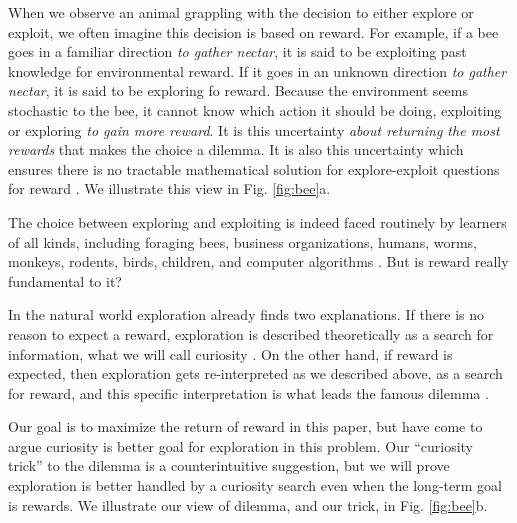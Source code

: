 When we observe an animal grappling with the decision to either explore or exploit, we often imagine this decision is based on reward. For example, if a bee goes in a familiar direction \textit{to gather nectar}, it is said to be exploiting past knowledge for environmental reward. If it goes in an unknown direction \textit{to gather nectar}, it is said to be exploring fo reward. Because the environment seems stochastic to the bee, it cannot know which action it should be doing, exploiting or exploring \textit{to gain more reward}. It is this uncertainty \textit{about returning the most rewards} that makes the choice a dilemma. It is also this uncertainty which ensures there is no tractable mathematical solution for explore-exploit questions for reward \citep{Thrun1992a,Dayan1996,Ishii2002,Simsek2006,Gershman2018b}. We illustrate this view in Fig. \ref{fig:bee}a.

The choice between exploring and exploiting is indeed faced routinely by learners of all kinds, including foraging bees, business organizations, humans, worms, monkeys, rodents, birds, children, and computer algorithms \citep{Gupta2006,Sutton2018,Woodgate2017,Lee2011a,Schulz2018a,Calhoun2014,Wang2019,Sumner2019,Auersperg2015}. But is reward really fundamental to it?

In the natural world exploration already finds two explanations. If there is no reason to expect a reward, exploration is described theoretically as a search for information, what we will call curiosity \citep{Berlyne1950,Schmidhuber1991,Kidd2015,deAbril2018,Jaegle2019,Friston2016}. On the other hand, if reward is expected, then exploration gets re-interpreted as we described above, as a search for reward, and this specific interpretation is what leads the famous dilemma \citep{Kelly1956,Berger-Tal2014,Dayan1996,Thrun1992,Mehlhorn2015,Kobayashi2019}. 

Our goal is to maximize the return of reward in this paper, but have come to argue curiosity is better goal for exploration in this problem. Our ``curiosity trick'' to the dilemma is a counterintuitive suggestion, but we will prove exploration is better handled by a curiosity search even when the long-term goal is rewards. We illustrate our view of dilemma, and our trick, in Fig. \ref{fig:bee}b.

